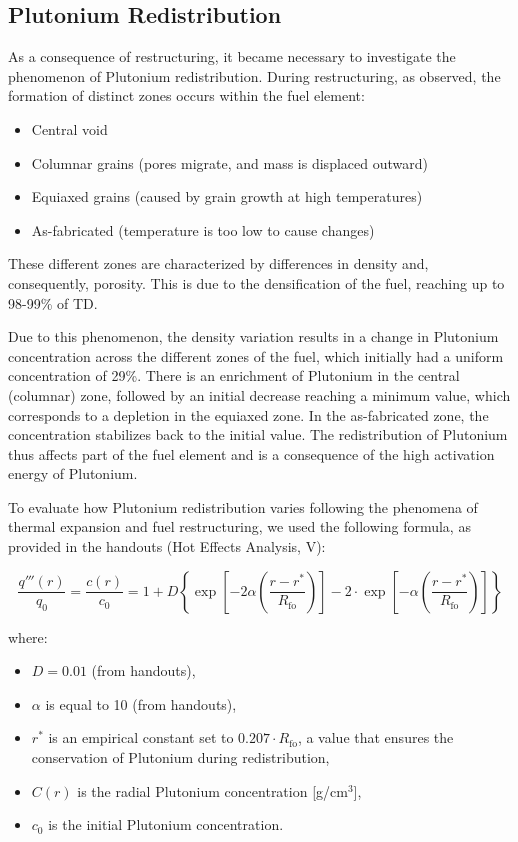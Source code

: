 \subsection{Plutonium Redistribution}

As a consequence of restructuring, it became necessary to investigate the phenomenon of Plutonium redistribution. During restructuring, as observed, the formation of distinct zones occurs within the fuel element:

\begin{itemize}
    \item Central void
    \item Columnar grains (pores migrate, and mass is displaced outward)
    \item Equiaxed grains (caused by grain growth at high temperatures)
    \item As-fabricated (temperature is too low to cause changes)
\end{itemize}

These different zones are characterized by differences in density and, consequently, porosity. This is due to the densification of the fuel, reaching up to 98-99\% of TD.

Due to this phenomenon, the density variation results in a change in Plutonium concentration across the different zones of the fuel, which initially had a uniform concentration of 29\%. There is an enrichment of Plutonium in the central (columnar) zone, followed by an initial decrease reaching a minimum value, which corresponds to a depletion in the equiaxed zone. In the as-fabricated zone, the concentration stabilizes back to the initial value. The redistribution of Plutonium thus affects part of the fuel element and is a consequence of the high activation energy of Plutonium.

To evaluate how Plutonium redistribution varies following the phenomena of thermal expansion and fuel restructuring, we used the following formula, as provided in the handouts (Hot Effects Analysis, V):

\begin{equation}
    \frac{q'''(r)}{q_0} = \frac{c(r)}{c_0} = 1 + D \left\{ 
    \exp \left[ -2 \alpha \left( \frac{r - r^*}{R_\text{fo}} \right) \right] 
    - 2 \cdot \exp \left[ -\alpha \left( \frac{r - r^*}{R_\text{fo}} \right) \right]
    \right\}
\end{equation}
    

where:
\begin{itemize}
    \item $D = 0.01$ (from handouts),
    \item $\alpha$ is equal to 10 (from handouts),
    \item $r^*$ is an empirical constant set to $0.207 \cdot R_\text{fo}$, a value that ensures the conservation of Plutonium during redistribution,
    \item $C(r)$ is the radial Plutonium concentration [g/cm\(^3\)],
    \item $c_0$ is the initial Plutonium concentration.
\end{itemize}

